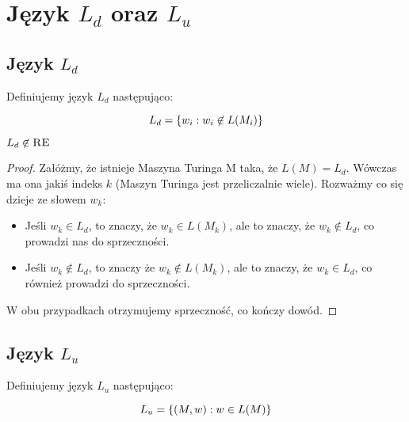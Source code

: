 \section{Język \texorpdfstring{\( L_d \)}{Ld} oraz \texorpdfstring{\(L_u\)}{Lu}}

\subsection{Język \texorpdfstring{\( L_d \)}{Ld}} 

\begin{definition} 
    Definiujemy język \(L_d\) następująco: 
    
    \[ 
        L_d = \set{w_i : w_i \not \in L(M_i)}
    \]
\end{definition}

\begin{theorem}
    \( L_d \not \in \textsc{RE} \)
\end{theorem}
\begin{proof}
    Załóżmy, że istnieje Maszyna Turinga M taka, że \(L(M) = L_d\). Wówczas ma ona jakiś indeks \(k\) (Maszyn Turinga jest przeliczalnie wiele). Rozważmy co się dzieje ze słowem \(w_k\):
    
    \begin{itemize}
        \item Jeśli \(w_k \in L_d\), to znaczy, że \(w_k \in L(M_k)\), ale to znaczy, że \(w_k \not \in L_d\), co prowadzi nas do sprzeczności.
        
        \item Jeśli \(w_k \not\in L_d\), to znaczy że \(w_k \not\in L(M_k)\), ale to znaczy, że \(w_k \in L_d\), co również prowadzi do sprzeczności.
    \end{itemize}
    
    W obu przypadkach otrzymujemy sprzeczność, co kończy dowód. 
\end{proof}
    
\subsection{Język \texorpdfstring{\(L_u\)}{Lu}} 

\begin{definition}
    Definiujemy język \(L_u\) następująco:
    
    \[ 
        L_u = \set{ (M, w) : w \in L(M)}
    \]
    
\end{definition}
    
